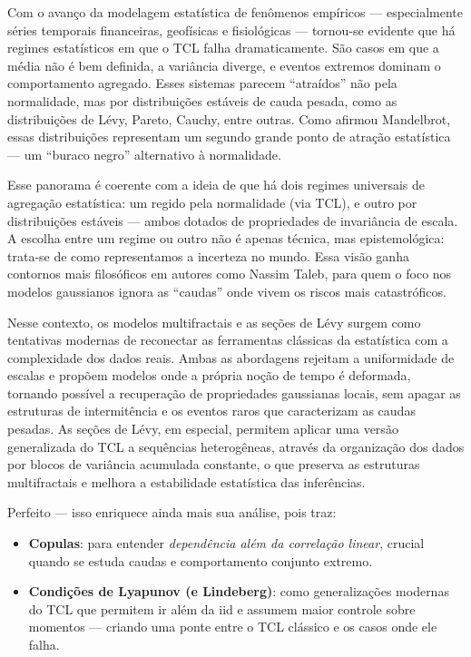 \documentclass[
  portuguese,
]{agujournal2019}
\providecommand{\tightlist}{%
  \setlength{\itemsep}{0pt}\setlength{\parskip}{0pt}}
\begin{document}
Com o avanço da modelagem estatística de fenômenos empíricos ---
especialmente séries temporais financeiras, geofísicas e fisiológicas
--- tornou-se evidente que há regimes estatísticos em que o TCL falha
dramaticamente. São casos em que a média não é bem definida, a variância
diverge, e eventos extremos dominam o comportamento agregado. Esses
sistemas parecem ``atraídos'' não pela normalidade, mas por
distribuições estáveis de cauda pesada, como as distribuições de Lévy,
Pareto, Cauchy, entre outras. Como afirmou Mandelbrot, essas
distribuições representam um segundo grande ponto de atração estatística
--- um ``buraco negro'' alternativo à normalidade.

Esse panorama é coerente com a ideia de que há dois regimes universais
de agregação estatística: um regido pela normalidade (via TCL), e outro
por distribuições estáveis --- ambos dotados de propriedades de
invariância de escala. A escolha entre um regime ou outro não é apenas
técnica, mas epistemológica: trata-se de como representamos a incerteza
no mundo. Essa visão ganha contornos mais filosóficos em autores como
Nassim Taleb, para quem o foco nos modelos gaussianos ignora as
``caudas'' onde vivem os riscos mais catastróficos.

Nesse contexto, os modelos multifractais e as seções de Lévy surgem como
tentativas modernas de reconectar as ferramentas clássicas da
estatística com a complexidade dos dados reais. Ambas as abordagens
rejeitam a uniformidade de escalas e propõem modelos onde a própria
noção de tempo é deformada, tornando possível a recuperação de
propriedades gaussianas locais, sem apagar as estruturas de
intermitência e os eventos raros que caracterizam as caudas pesadas. As
seções de Lévy, em especial, permitem aplicar uma versão generalizada do
TCL a sequências heterogêneas, através da organização dos dados por
blocos de variância acumulada constante, o que preserva as estruturas
multifractais e melhora a estabilidade estatística das inferências.

Perfeito --- isso enriquece ainda mais sua análise, pois traz:

\begin{itemize}
\tightlist
\item
  \textbf{Copulas}: para entender \emph{dependência além da correlação
  linear}, crucial quando se estuda caudas e comportamento conjunto
  extremo.
\item
  \textbf{Condições de Lyapunov (e Lindeberg)}: como generalizações
  modernas do TCL que permitem ir além da iid e assumem maior controle
  sobre momentos --- criando uma ponte entre o TCL clássico e os casos
  onde ele falha.
\end{itemize}
\end{document}
